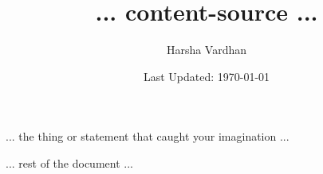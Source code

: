 \documentclass[12pt, a4paper]{article}
\begin{document}
\title{... content-source ...}
\author{Harsha Vardhan}
\date{Last Updated: \today}

\maketitle
\bigskip

\begin{tcolorbox}[title={some-title-for-box}]
... the thing or statement that caught your imagination ...
\end{tcolorbox}

... rest of the document ...
\end{document}

